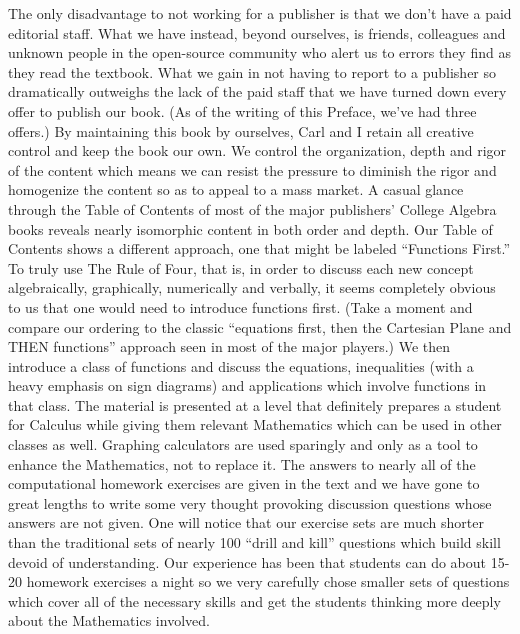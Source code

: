 \medskip

\noindent The only disadvantage to not working for a publisher is that we don't have a paid editorial staff.  What we have instead, beyond ourselves, is friends, colleagues and unknown people in the open-source community who alert us to errors they find as they read the textbook.  What we gain in not having to report to a publisher so dramatically outweighs the lack of the paid staff that we have turned down every offer to publish our book.  (As of the writing of this Preface, we've had three offers.)  By maintaining this book by ourselves, Carl and I retain all creative control and keep the book our own.  We control the organization, depth and rigor of the content which means we can resist the pressure to diminish the rigor and homogenize the content so as to appeal to a mass market.  A casual glance through the Table of Contents of most of the major publishers' College Algebra books reveals nearly isomorphic content in both order and depth.   Our Table of Contents shows a different approach, one that might be labeled ``Functions First.''  To truly use The Rule of Four, that is, in order to discuss each new concept algebraically, graphically, numerically and verbally, it seems completely obvious to us that one would need to introduce functions first.  (Take a moment and compare our ordering to the classic ``equations first, then the Cartesian Plane and THEN functions'' approach seen in most of the major players.)  We then introduce a class of functions and discuss the equations, inequalities (with a heavy emphasis on sign diagrams) and applications which involve functions in that class.  The material is presented at a level that definitely prepares a student for Calculus while giving them relevant Mathematics which can be used in other classes as well.  Graphing calculators are used sparingly and only as a tool to enhance the Mathematics, not to replace it.  The answers to nearly all of the computational homework exercises are given in the text and we have gone to great lengths to write some very thought provoking discussion questions whose answers are not given.  One will notice that our exercise sets are much shorter than the traditional sets of nearly 100 ``drill and kill'' questions which build skill devoid of understanding.  Our experience has been that students can do about 15-20 homework exercises a night so we very carefully chose smaller sets of questions which cover all of the necessary skills and get the students thinking more deeply about the Mathematics involved.

